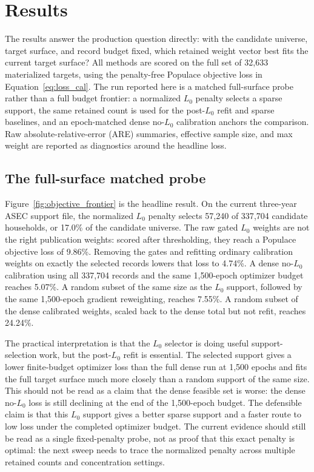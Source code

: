 \section{Results}
\label{sec:results}

The results answer the production question directly: with the candidate universe, target surface, and
record budget fixed, which retained weight vector best fits the current \populace{} target surface? All
methods are scored on the full set of 32{,}633 materialized targets, using the penalty-free Populace
objective loss in Equation~\ref{eq:loss_cal}. The run reported here is a matched full-surface probe rather
than a full budget frontier: a normalized $L_0$ penalty selects a sparse support, the same retained count
is used for the post-$L_0$ refit and sparse baselines, and an epoch-matched dense no-$L_0$ calibration
anchors the comparison. Raw absolute-relative-error (ARE) summaries, effective sample size, and max weight
are reported as diagnostics around the headline loss.

\subsection{The full-surface matched probe}

Figure~\ref{fig:objective_frontier} is the headline result. On the current three-year ASEC support file,
the normalized $L_0$ penalty selects 57{,}240 of 337{,}704 candidate households, or 17.0\% of the
candidate universe. The raw gated $L_0$ weights are not the right publication weights: scored after
thresholding, they reach a Populace objective loss of 9.86\%. Removing the gates and refitting ordinary
calibration weights on exactly the selected records lowers that loss to 4.74\%. A dense no-$L_0$
calibration using all 337{,}704 records and the same 1{,}500-epoch optimizer budget reaches 5.07\%. A
random subset of the same size as the $L_0$ support, followed by the same 1{,}500-epoch gradient
reweighting, reaches 7.55\%. A random subset of the dense calibrated weights, scaled back to the dense
total but not refit, reaches 24.24\%.

The practical interpretation is that the $L_0$ selector is doing useful support-selection work, but the
post-$L_0$ refit is essential. The selected support gives a lower finite-budget optimizer loss than
the full dense run at 1{,}500 epochs and fits the full target surface much more closely than a random
support of the same size. This should not be read as a claim that the dense feasible set is worse: the
dense no-$L_0$ loss is still declining at the end of the 1{,}500-epoch budget. The defensible claim is that
this $L_0$ support gives a better sparse support and a faster route to low loss under the completed
optimizer budget. The current evidence should still be read as a single fixed-penalty probe, not as proof
that this exact penalty is optimal: the next sweep needs to trace the normalized penalty across multiple
retained counts and concentration settings.

